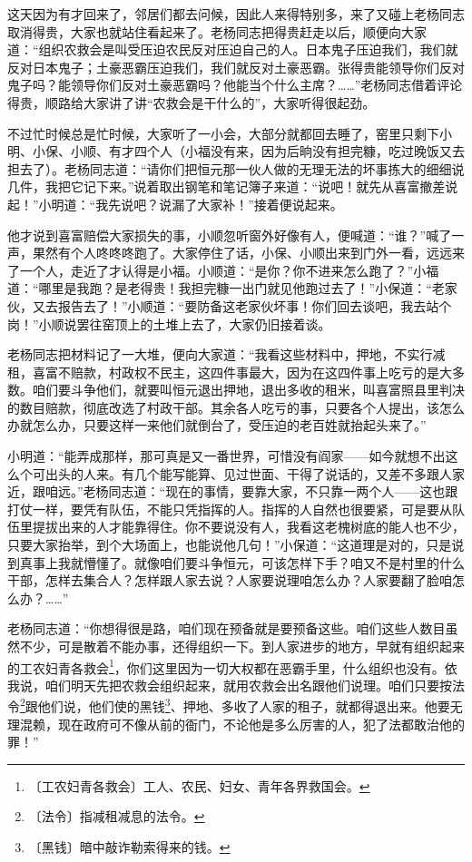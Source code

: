 \documentclass[12pt,UTF-8,openany]{ctexbook}
\begin{document}
\begin{large}
    这天因为有才回来了，邻居们都去问候，因此人来得特别多，来了又碰上老杨同志取消得贵，大家也就站住看起来了。老杨同志把得贵赶走以后，顺便向大家道：“组织农救会是叫受压迫农民反对压迫自己的人。日本鬼子压迫我们，我们就反对日本鬼子；土豪恶霸压迫我们，我们就反对土豪恶霸。张得贵能领导你们反对鬼子吗？能领导你们反对土豪恶霸吗？他能当个什么主席？……”老杨同志借着评论得贵，顺路给大家讲了讲“农救会是干什么的”，大家听得很起劲。
    
    不过忙时候总是忙时候，大家听了一小会，大部分就都回去睡了，窑里只剩下小明、小保、小顺、有才四个人（小福没有来，因为后晌没有担完糠，吃过晚饭又去担去了）。老杨同志道：“请你们把恒元那一伙人做的无理无法的坏事拣大的细细说几件，我把它记下来。”说着取出钢笔和笔记簿子来道：“说吧！就先从喜富撤差说起！”小明道：“我先说吧？说漏了大家补！”接着便说起来。
    
    他才说到喜富赔偿大家损失的事，小顺忽听窗外好像有人，便喊道：“谁？”喊了一声，果然有个人咚咚咚跑了。大家停住了话，小保、小顺出来到门外一看，远远来了一个人，走近了才认得是小福。小顺道：“是你？你不进来怎么跑了？”小福道：“哪里是我跑？是老得贵！我担完糠一出门就见他跑过去了！”小保道：“老家伙，又去报告去了！”小顺道：“要防备这老家伙坏事！你们回去谈吧，我去站个岗！”小顺说罢往窑顶上的土堆上去了，大家仍旧接着谈。
    
    老杨同志把材料记了一大堆，便向大家道：“我看这些材料中，押地，不实行减租，喜富不赔款，村政权不民主，这四件事最大，因为在这四件事上吃亏的是大多数。咱们要斗争他们，就要叫恒元退出押地，退出多收的租米，叫喜富照县里判决的数目赔款，彻底改选了村政干部。其余各人吃亏的事，只要各个人提出，该怎么办就怎么办，只要这样一来他们就倒台了，受压迫的老百姓就抬起头来了。”
    
    小明道：“能弄成那样，那可真是又一番世界，可惜没有阎家——如今就想不出这么个可出头的人来。有几个能写能算、见过世面、干得了说话的，又差不多跟人家近，跟咱远。”老杨同志道：“现在的事情，要靠大家，不只靠一两个人——这也跟打仗一样，要凭有队伍，不能只凭指挥的人。指挥的人自然也很要紧，可是要从队伍里提拔出来的人才能靠得住。你不要说没有人，我看这老槐树底的能人也不少，只要大家抬举，到个大场面上，也能说他几句！”小保道：“这道理是对的，只是说到真事上我就懵懂了。就像咱们要斗争恒元，可该怎样下手？咱又不是村里的什么干部，怎样去集合人？怎样跟人家去说？人家要说理咱怎么办？人家要翻了脸咱怎么办？……”
    
    老杨同志道：“你想得很是路，咱们现在预备就是要预备这些。咱们这些人数目虽然不少，可是散着不能办事，还得组织一下。到人家进步的地方，早就有组织起来的工农妇青各救会\footnote{〔工农妇青各救会〕工人、农民、妇女、青年各界救国会。}，你们这里因为一切大权都在恶霸手里，什么组织也没有。依我说，咱们明天先把农救会组织起来，就用农救会出名跟他们说理。咱们只要按法令\footnote{〔法令〕指减租减息的法令。}跟他们说，他们使的黑钱\footnote{〔黑钱〕暗中敲诈勒索得来的钱。}、押地、多收了人家的租子，就都得退出来。他要无理混赖，现在政府可不像从前的衙门，不论他是多么厉害的人，犯了法都敢治他的罪！”
    

\end{large}
\end{document}
